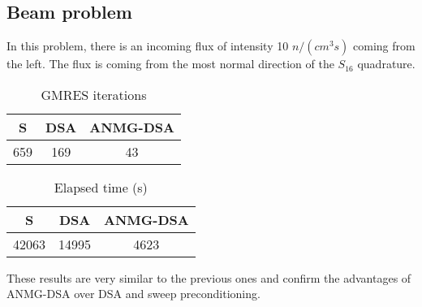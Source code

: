 \subsection{Beam problem}
In this problem, there is an incoming flux of intensity 10 $n/(cm^3s)$ 
coming from the left. The flux is coming from the most normal direction 
of the $S_{16}$ quadrature. 
\begin{table}[H]
\begin{center}
\begin{tabular}{|c|c|c|}
\hline  
S & DSA & ANMG-DSA \\
\hline
659 & 169 & 43 \\
\hline
\end{tabular}
\caption{GMRES iterations}
\end{center}
\end{table}

\begin{table}[H]
\begin{center}
\begin{tabular}{|c|c|c|}
\hline  
S & DSA & ANMG-DSA \\
\hline
42063 & 14995 & 4623\\
\hline
\end{tabular}
\caption{Elapsed time (s)}
\end{center}
\end{table}
These results are very similar to the previous ones and confirm the advantages
of ANMG-DSA over DSA and sweep preconditioning. 

